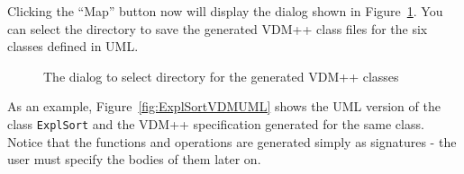 \documentclass[\pformat,12pt]{article}
\newcommand{\vdmpp}{VDM++}
\begin{document}
Clicking the ``Map'' button now will display the dialog shown in Figure~\ref{fig:selectDirectory}.
You can select the directory to save the generated \vdmpp{} class files for the
six classes defined in UML.

\begin{figure}[!htb]
\begin{center}
\mbox{}
\caption{The dialog to select directory for the generated \vdmpp{} classes \label{fig:selectDirectory}}
\end{center}
\end{figure}
As an example, Figure~\ref{fig:ExplSortVDMUML} shows the UML version of the class
{\tt ExplSort} and the \vdmpp{} specification generated for the same class. 
Notice that
the functions and operations are generated simply as signatures - the
user must specify the bodies of them later on.
\end{document}

